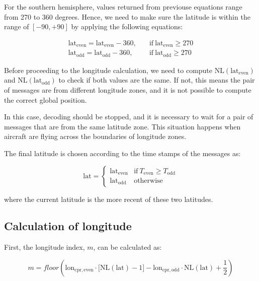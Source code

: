 For the southern hemisphere, values returned from previouse equations range from 270 to 360 degrees. Hence, we need to make sure the latitude is within the range of $[-90, +90]$ by applying the following equations:

\begin{equation}
  \begin{split}
    \mathrm{lat}_\mathrm{even} = \mathrm{lat}_\mathrm{even} - 360,  \quad &\text{if}~\mathrm{lat}_\mathrm{even} \ge 270 \\
    \mathrm{lat}_\mathrm{odd} = \mathrm{lat}_\mathrm{odd} - 360,  \quad &\text{if}~\mathrm{lat}_\mathrm{odd} \ge 270
  \end{split}
\end{equation}


Before proceeding to the longitude calculation, we need to compute $\mathrm{NL}(\mathrm{lat}_\mathrm{even})$ and $\mathrm{NL}(\mathrm{lat}_\mathrm{odd})$ to check if both values are the same. If not, this means the pair of messages are from different longitude zones, and it is not possible to compute the correct global position.

In this case, decoding should be stopped, and it is necessary to wait for a pair of messages that are from the same latitude zone. This situation happens when aircraft are flying across the boundaries of longitude zones.


The final latitude is chosen according to the time stamps of the messages as:

\begin{equation}
  \mathrm{lat} =
  \begin{cases}
   \mathrm{lat}_\mathrm{even}     & \text{if}~T_\mathrm{even} \ge T_\mathrm{odd} \\
   \mathrm{lat}_\mathrm{odd}     & \text{otherwise}
  \end{cases}
\end{equation}

where the current latitude is the more recent of these two latitudes.

\subsection{Calculation of longitude} \label{sec:cpr_airborne_global_lon}

First, the longitude index, $m$, can be calculated as:

\begin{equation}
  m = floor \left( \mathrm{lon}_\mathrm{cpr, even} \cdot \Big[ \mathrm{NL}(\mathrm{lat})-1 \Big] - \mathrm{lon}_\mathrm{cpr,odd} \cdot \mathrm{NL}(\mathrm{lat}) + \frac{1}{2}  \right)
\end{equation}


